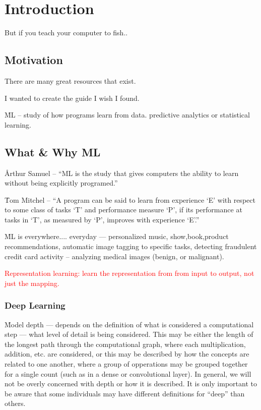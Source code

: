 \chapter{Introduction}

But if you teach your computer to fish..


\section{Motivation}
There are many great resources that exist.

I wanted to create the guide I wish I found.

\r{ML -- study of how programs learn from data. predictive analytics or statistical learning.}



\section{What \& Why ML}
\r{Arthur Samuel -- ``ML is the study that gives computers the ability to learn without being explicitly programed.''}

\r{Tom Mitchel -- ``A program can be said to learn from experience `E' with respect to some class of tasks `T' and performance measure `P', if its performance at tasks in `T', as measured by `P', improves with experience `E'.''}

\r{ML is everywhere.... everyday --- personalized music, show,book,product recommendations, automatic image tagging to specific tasks, detecting fraudulent credit card activity -- analyzing medical images (benign, or malignant). }


\textcolor{red}{Representation learning: learn the representation from from input to output, not just the mapping.}

\subsection{Deep Learning}


\r{Model depth --- depends on the definition of what is considered a computational step --- what level of detail is being considered. This may be either the length of the longest path through the computational graph, where each multiplication, addition, etc. are considered, or this may be described by how the concepts are related to one another, where a group of opperations may be grouped together for a single count (such as in a dense or convolutional layer). In general, we will not be overly concerned with depth or how it is described. It is only important to be aware that some individuals may have different definitions for ``deep'' than others.}

